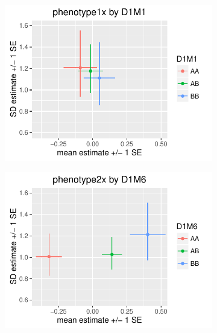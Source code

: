 \documentclass{article}
\begin{document}
\begin{figure}[htbp]
    \begin{subfigure}[t]{0.5\textwidth}
        \includegraphics[width=\textwidth]{images/mean_var_plot_phen1x.pdf}
    \end{subfigure}
    \hfill
    \begin{subfigure}[t]{0.5\textwidth}
        \includegraphics[width=\textwidth]{images/mean_var_plot_phen2x.pdf}
    \end{subfigure}


\end{figure}
\end{document}
